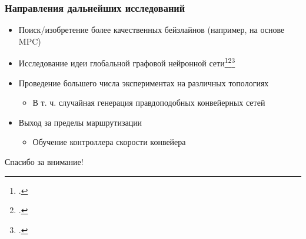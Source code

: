 \documentclass{beamer}
\begin{document}
\begin{frame}
  \frametitle{Направления дальнейших исследований}
  \begin{itemize}
  \item Поиск/изобретение более качественных бейзлайнов (например, на основе MPC)
  \item Исследование идеи глобальной графовой нейронной сети\footcite{scarselli2009graph}\footcite{li2015gated}\footcite{geyer2018learning}
  \item Проведение большего числа экспериментах на различных топологиях
    \begin{itemize}
      \item В т. ч. случайная генерация правдоподобных конвейерных сетей
    \end{itemize}
  \item Выход за пределы маршрутизации
    \begin{itemize}
      \item Обучение контроллера скорости конвейера
    \end{itemize} 
  \end{itemize}
\end{frame}


\begin{frame}
  \begin{center}
    {\Huge Спасибо за внимание!}
  \end{center}
\end{frame}

\appendix
\end{document}
